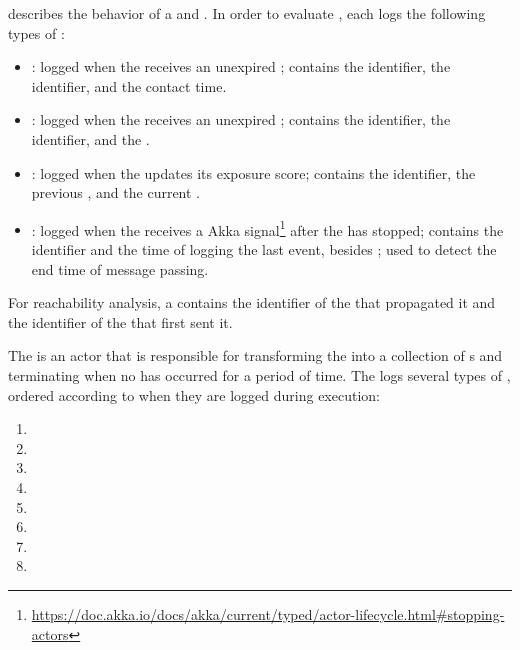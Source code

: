  describes the behavior of a  and . In order to evaluate , each  logs the following types of :
\begin{itemize}
  \item {}: logged when the  receives an unexpired ; contains the  identifier, the  identifier, and the contact time.
  \item {}: logged when the  receives an unexpired ; contains the  identifier, the  identifier, and the .
  \item {}: logged when the  updates its exposure score; contains the  identifier, the previous , and the current .
  \item {}: logged when the  receives a  Akka signal\footnote{\url{https://doc.akka.io/docs/akka/current/typed/actor-lifecycle.html\#stopping-actors}} after the  has stopped; contains the  identifier and the time of logging the last event, besides ; used to detect the end time of message passing.
\end{itemize}
For reachability analysis, a  contains the identifier of the  that propagated it and the identifier of the  that first sent it.

The  is an actor that is responsible for transforming the  into a collection of s and terminating when no  has occurred for a period of time. The  logs several types of , ordered according to when they are logged during execution:

\begin{multicols}{2}
\begin{enumerate}
  \item {}
  \item {}
  \item {}
  \item {}
  \item {}
  \item {}
  \item {}
  \item {}
\end{enumerate}
\end{multicols}


